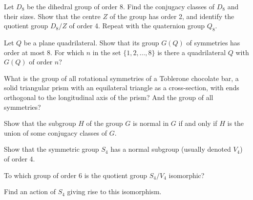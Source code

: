 \begin{problem}
Let $D_8$ be the dihedral group of order 8. Find the conjugacy classes of $D_8$ and their sizes. Show that the centre $Z$ of the group has order 2, and identify the quotient group $D_8/Z$ of order 4. Repeat with the quaternion group $Q_8$.
\end{problem} 

\begin{solution}[\bf Solution.]
\end{solution}

\begin{problem}
Let $Q$ be a plane quadrilateral. Show that its group $G(Q)$ of symmetries has order at most 8. For which $n$ in the set $\{1, 2,\dots, 8\}$ is there a quadrilateral $Q$ with $G(Q)$ of order $n$?

\end{problem} 

\begin{solution}[\bf Solution.]

\end{solution}

\begin{problem}
What is the group of all rotational symmetries of a Toblerone chocolate bar, a solid triangular prism with an equilateral triangle as a cross-section, with ends orthogonal to the longitudinal axis of the prism? And the group of all symmetries?

\end{problem} 

\begin{solution}[\bf Solution.]

\end{solution}

\begin{problem}
Show that the subgroup $H$ of the group $G$ is normal in $G$ if and only if $H$ is the union of some conjugacy classes of $G$.

Show that the symmetric group $S_4$ has a normal subgroup (usually denoted $V_4$) of order 4.

To which group of order 6 is the quotient group $S_4/V_4$ isomorphic?

Find an action of $S_4$ giving rise to this isomorphism.

\end{problem} 

\begin{solution}[\bf Solution.]

\end{solution}



